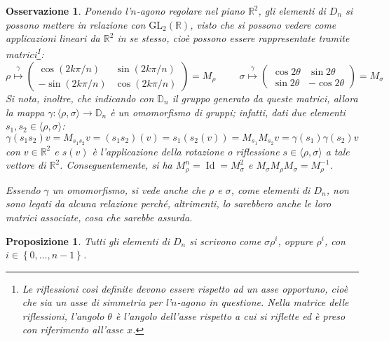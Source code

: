\documentclass[12pt]{scrartcl}
\theoremstyle{style}
\newtheorem{prop}{Proposizione}[section]
\newtheorem{osservazione}{Osservazione}[section]
\numberwithin{equation}{subsection}
\begin{document}
\begin{osservazione}
	Ponendo l'$n$-agono regolare nel piano $\mathbb{R}^2$, gli elementi di $D_n$ si possono mettere in relazione con $\mathrm{GL} _2(\mathbb{R})$, visto che si possono vedere come applicazioni lineari da $\mathbb{R}^2$ in se stesso, cio\`e possono essere rappresentate tramite matrici\footnote{Le riflessioni cos\`i definite devono essere rispetto ad un asse opportuno, cio\`e che sia un asse di simmetria per l'$n$-agono in questione. Nella matrice delle riflessioni, l'angolo $\theta $ \`e l'angolo dell'asse rispetto a cui si riflette ed \`e preso con riferimento all'asse $x$.}:
\begin{equation*}
	\rho  \stackrel{\gamma}{\longmapsto} \begin{pmatrix} \displaystyle \cos \left(2k\pi / n\right) & \sin \left(2k\pi / n\right) \\ - \sin \left( 2k\pi / n\right) & \cos (2k\pi / n) \end{pmatrix}=M_\rho  \hspace{1cm}\sigma \stackrel{\gamma}{\longmapsto} \begin{pmatrix} \cos 2 \theta  & \sin 2\theta  \\ \sin 2\theta  & - \cos 2\theta  \end{pmatrix} = M_\sigma 
\end{equation*}
Si nota, inoltre, che indicando con $\mathbb{D}_n$ il gruppo generato da queste matrici, allora la mappa $\gamma : \langle \rho ,\sigma  \rangle\to \mathbb{D}_n$ \`e un omomorfismo di gruppi; infatti, dati due elementi $s_1,s_2 \in \langle \rho ,\sigma  \rangle$:
\[
\gamma(s_1s_2)v= M_{s_1s_2} v = (s_1s_2) (v) = s_1 (s_2 (v)) =M_{s_1} M_{s_2} v = \gamma(s_1)\gamma(s_2)v
\] 
con $v \in \mathbb{R}^2$ e $s(v)$ \`e l'applicazione della rotazione o riflessione $s \in \langle \rho ,\sigma  \rangle$ a tale vettore di $\mathbb{R}^2$.
Conseguentemente, si ha $M_\rho ^n = \operatorname{Id}=M_\sigma ^2 $ e $M_\sigma M_\rho M_\sigma = M_\rho ^{-1}$.

Essendo $\gamma$ un omomorfismo, si vede anche che $\rho $ e $\sigma $, come elementi di $D_n$, non sono legati da alcuna relazione perch\'e, altrimenti, lo sarebbero anche le loro matrici associate, cosa che sarebbe assurda. 
\end{osservazione}
\begin{prop}\label{dnitems}
	Tutti gli elementi di $D_n$ si scrivono come $\sigma \rho ^i$, oppure $\rho ^i$, con $i \in \left\{ 0,\ldots,n-1 \right\} $.
\end{prop}
\end{document}
